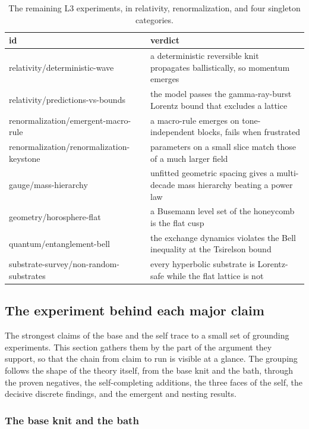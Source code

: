 \begin{table}[ht]
\centering
\begin{tabular}{@{}ll@{}}
\toprule
id & verdict \\
\midrule
relativity/deterministic-wave & a deterministic reversible knit propagates ballistically, so momentum emerges \\
relativity/predictions-vs-bounds & the model passes the gamma-ray-burst Lorentz bound that excludes a lattice \\
renormalization/emergent-macro-rule & a macro-rule emerges on tone-independent blocks, fails when frustrated \\
renormalization/renormalization-keystone & parameters on a small slice match those of a much larger field \\
gauge/mass-hierarchy & unfitted geometric spacing gives a multi-decade mass hierarchy beating a power law \\
geometry/horosphere-flat & a Busemann level set of the honeycomb is the flat cusp \\
quantum/entanglement-bell & the exchange dynamics violates the Bell inequality at the Tsirelson bound \\
substrate-survey/non-random-substrates & every hyperbolic substrate is Lorentz-safe while the flat lattice is not \\
\bottomrule
\end{tabular}
\caption{The remaining L3 experiments, in relativity, renormalization, and four singleton categories.}
\label{tab:l3-rest}
\end{table}

\subsection{The experiment behind each major claim}

The strongest claims of the base and the self trace to a small set of grounding experiments. This section gathers them by the part of the argument they support, so that the chain from claim to run is visible at a glance. The grouping follows the shape of the theory itself, from the base knit and the bath, through the proven negatives, the self-completing additions, the three faces of the self, the decisive discrete findings, and the emergent and nesting results.

\subsubsection{The base knit and the bath}

